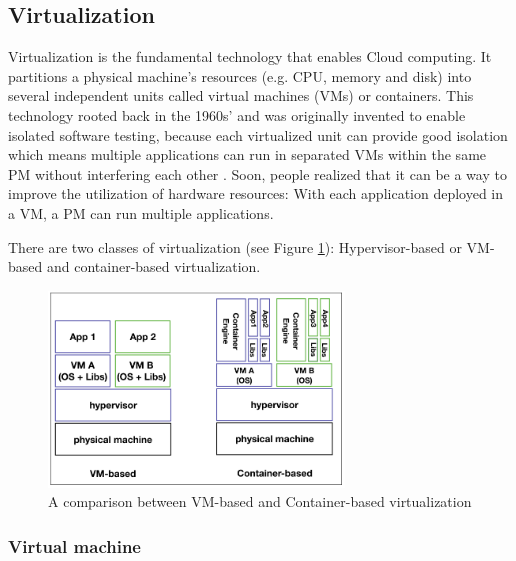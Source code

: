 \subsection{Virtualization}
\label{sec:virtualization}
Virtualization \cite{Uhlig:2005do} is the fundamental technology that enables Cloud computing. It partitions a physical machine's resources (e.g. CPU, memory and disk) into several independent units called virtual machines (VMs) or containers. This technology rooted back in the 1960s' and was originally invented to enable isolated software testing, because each virtualized unit can provide good isolation which means multiple applications can run in separated VMs within the same PM without interfering each other \cite{Somani:2009ho}. 
Soon, people realized that it can be a way to improve the utilization of hardware resources: With each application deployed in a VM, a PM can run multiple applications. 


There are two classes of virtualization (see Figure \ref{fig:comparison}): Hypervisor-based or VM-based and container-based virtualization.

\begin{figure}
	\centering
	\includegraphics[width=0.7\textwidth]{pics/comparison.png}
	\caption{A comparison between VM-based and Container-based virtualization \cite{Piraghaj:2016bw}}
	\label{fig:comparison}
\end{figure}

\subsubsection{Virtual machine}

